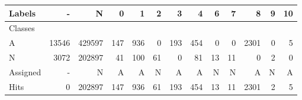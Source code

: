 \begin{tabular}{l|r|r|r|r|r|r|r|r|r|r|r|r}

Labels &      - &       N &    0 &    1 &   2 &    3 &    4 &   6 &   7 &     8 &  9 & 10 \\\hline
Classes  &        &         &      &      &     &      &      &     &     &       &    &    \\\hline
\hline
A        &  13546 &  429597 &  147 &  936 &   0 &  193 &  454 &   0 &   0 &  2301 &  0 &  5 \\\hline
N        &   3072 &  202897 &   41 &  100 &  61 &    0 &   81 &  13 &  11 &     0 &  2 &  0 \\\hline
\hline
Assigned &      - &       N &    A &    A &   N &    A &    A &   N &   N &     A &  N &  A \\\hline
Hits     &      0 &  202897 &  147 &  936 &  61 &  193 &  454 &  13 &  11 &  2301 &  2 &  5 
\end{tabular}

